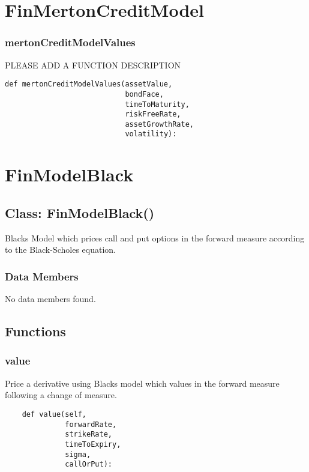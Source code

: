 \documentclass[twoside,11pt]{book}
\begin{document}
\newpage
\section{FinMertonCreditModel}

\subsubsection*{{\bf mertonCreditModelValues}}
PLEASE ADD A FUNCTION DESCRIPTION

\begin{lstlisting}
def mertonCreditModelValues(assetValue,
                            bondFace,
                            timeToMaturity,
                            riskFreeRate,
                            assetGrowthRate,
                            volatility):
\end{lstlisting}

\newpage
\section{FinModelBlack}

\subsection*{Class: FinModelBlack()}
Blacks Model which prices call and put options in the forward measure according to the Black-Scholes equation.  

\subsubsection*{Data Members}
No data members found.

\subsection*{Functions}

\subsubsection*{{\bf value}}
Price a derivative using Blacks model which values in the forward measure following a change of measure.  

\begin{lstlisting}
    def value(self,
              forwardRate,
              strikeRate,
              timeToExpiry,
              sigma,
              callOrPut):
\end{lstlisting}
\end{document}
